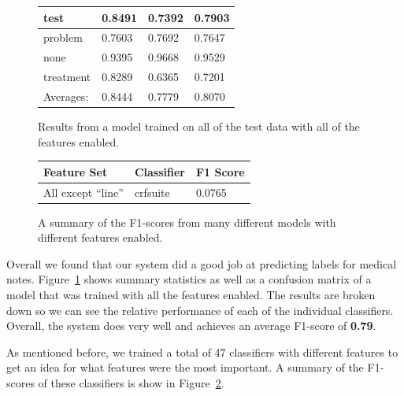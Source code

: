 \documentclass[preprint]{style}
\begin{document}
\begin{figure}[t]
\begin{center}
\begin{tabular}{|l|l|l|l|}
     test & 0.8491 &	0.7392	& 0.7903 \\ \hline
  problem & 0.7603 &	0.7692 &	0.7647 \\ \hline
     none & 0.9395	 & 0.9668	& 0.9529 \\ \hline
treatment & 0.8289 &	0.6365 &	0.7201\\ \hline

	\hline
	Averages: & 0.8444 &	 0.7779  & 	0.8070 \\
	\hline
	\end{tabular}
\end{center}

\caption{Results from a model trained on all of the test data with all of the features enabled.}
\label{fig:all_features_results}
\end{figure}


\begin{figure}
\begin{center}



	\begin{tabular}{|l|l|l|}
	\hline
	{\bf Feature Set} & {\bf Classifier} & {\bf F1 Score}  \\ \hline
	All except ``line'' &  crfsuite &  0.0765  \\ \hline
	
	
	
	

	\end{tabular}



	
\end{center}
\caption{A summary of the F1-scores from many different models with different features enabled.}
\label{fig:summary_f1_scores}
\end{figure}

Overall we found that our system did a good job at predicting labels for medical notes. Figure~\ref{fig:all_features_results} shows summary statistics as well as a confusion matrix of a model that was trained with all the features enabled. The results are broken down so we can see the relative performance of each of the individual classifiers. Overall, the system does very well and achieves an average F1-score of {\bf 0.79}.

As mentioned before, we trained a total of 47 classifiers with different features to get an idea for what features were the most important. A summary of the F1-scores of these classifiers is show in Figure~\ref{fig:summary_f1_scores}.
\end{document}
